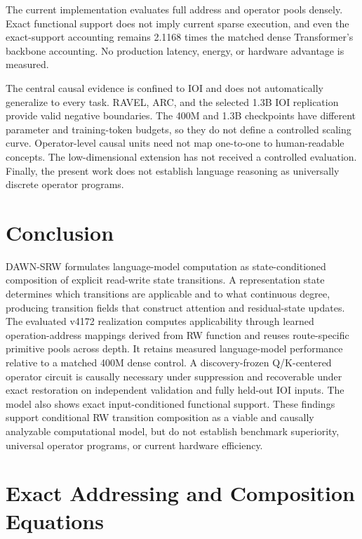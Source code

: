 \documentclass{article}
\newcommand{\DAWN}{DAWN-SRW}
\begin{document}
The current implementation evaluates full address and operator pools densely.
Exact functional support does not imply current sparse execution, and even the
exact-support accounting remains 2.1168 times the matched dense Transformer's
backbone accounting. No production latency, energy, or hardware advantage is
measured.

The central causal evidence is confined to IOI and does not automatically
generalize to every task. RAVEL, ARC, and the selected 1.3B IOI replication
provide valid negative boundaries. The 400M and 1.3B checkpoints have
different parameter and training-token budgets, so they do not define a
controlled scaling curve. Operator-level causal units need not map one-to-one
to human-readable concepts. The low-dimensional extension has not received a
controlled evaluation. Finally, the present work does not establish language
reasoning as universally discrete operator programs.

\section{Conclusion}

\DAWN{} formulates language-model computation as state-conditioned composition
of explicit read-write state transitions. A representation state determines
which transitions are applicable and to what continuous degree, producing
transition fields that construct attention and residual-state updates. The
evaluated v4172 realization computes applicability through learned
operation-address mappings derived from RW function and reuses route-specific
primitive pools across depth. It retains measured language-model performance
relative to a matched 400M dense control. A discovery-frozen Q/K-centered
operator circuit is causally necessary under suppression and recoverable under
exact restoration on independent validation and fully held-out IOI inputs. The
model also shows exact input-conditioned functional support. These findings
support conditional RW transition composition as a viable and causally
analyzable computational model, but do not establish benchmark superiority,
universal operator programs, or current hardware efficiency.

\appendix

\section{Exact Addressing and Composition Equations}
\label{app:equations}
\end{document}
